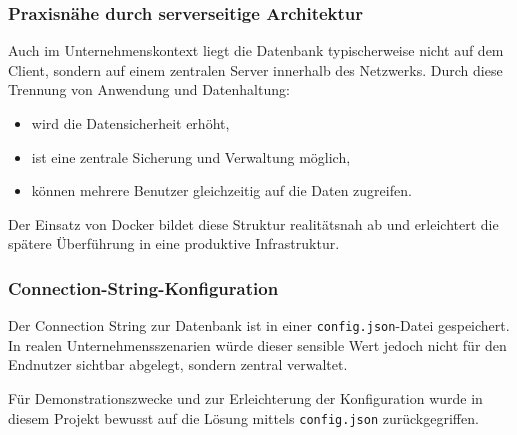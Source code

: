 \subsubsection*{Praxisnähe durch serverseitige Architektur}

Auch im Unternehmenskontext liegt die Datenbank typischerweise nicht auf dem Client, sondern auf einem zentralen Server innerhalb des Netzwerks. Durch diese Trennung von Anwendung und Datenhaltung:

\begin{itemize}
    \item wird die Datensicherheit erhöht,
    \item ist eine zentrale Sicherung und Verwaltung möglich,
    \item können mehrere Benutzer gleichzeitig auf die Daten zugreifen.
\end{itemize}

Der Einsatz von Docker bildet diese Struktur realitätsnah ab und erleichtert die spätere Überführung in eine produktive Infrastruktur.

\subsubsection*{Connection-String-Konfiguration}
Der Connection String zur Datenbank ist in einer \texttt{config.json}-Datei gespeichert. In realen Unternehmensszenarien würde dieser sensible Wert jedoch nicht für den Endnutzer sichtbar abgelegt, sondern zentral verwaltet.

Für Demonstrationszwecke und zur Erleichterung der Konfiguration wurde in diesem Projekt bewusst auf die Lösung mittels \texttt{config.json} zurückgegriffen.
